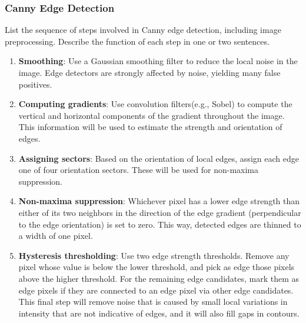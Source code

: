 \documentclass[12pt,letterpaper]{article}
\begin{document}
\subsubsection{Canny Edge Detection}
List   the   sequence   of   steps   involved   in   Canny   edge   detection,   including   image preprocessing. Describe the function of each step in one or two sentences.  \color{red}
\begin{enumerate}
    \item \textbf{Smoothing}:  Use  a  Gaussian  smoothing  filter  to  reduce  the  local  noise  in  the image. Edge detectors are strongly affected by noise, yielding many false positives. 
    \item \textbf{Computing gradients}: Use convolution filters(e.g., Sobel) to compute the vertical and horizontal components of the gradient throughout the image. This information will be used to estimate the strength and orientation of edges.
    \item \textbf{Assigning sectors}: Based on the orientation of local edges, assign each edge one of four orientation sectors. These will be used for non-maxima suppression. 
    \item \textbf{Non-maxima suppression}: Whichever pixel has a lower edge strength than either of  its  two  neighbors  in  the  direction  of  the  edge  gradient  (perpendicular  to  the  edge orientation) is set to zero. This way, detected edges are thinned to a width of one pixel.
    \item   \textbf{Hysteresis  thresholding}: Use  two edge  strength thresholds. Remove  any  pixel whose value is below the lower threshold, and pick as edge those pixels above the higher threshold. For  the  remaining  edge  candidates,  mark  them  as  edge  pixels  if  they  are connected  to  an edge  pixel  via  other  edge  candidates. This  final  step  will  remove  noise that is caused by small local variations in intensity that are not indicative of edges, and it will also fill gaps in contours.
\end{enumerate}
\color{black}
\end{document}
